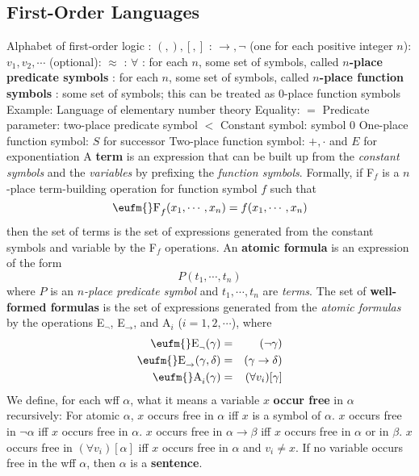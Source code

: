 \documentclass{myproc}
\def\EE{\mbox{\eufm{}E}}
\begin{document}
\subsection{First-Order Languages}
\bit
\w Alphabet of first-order logic
	\bit
		\bit
		: $(, ), [, ]$
		: $\rightarrow, \neg$
		 (one for each positive integer $n$):
			$v_1, v_2, \cdots$
		 (optional): $\approx$
		\eit
		\bit
		: $\forall$
		: for each $n$, some set of symbols,
				called {\bf{}$n$-place predicate symbols}
		: for each $n$, some set of symbols,
				called {\bf{}$n$-place function symbols}
		: some set of symbols; this can be 
			treated as $0$-place function symbols
		\eit
	\eit
\w Example: Language of elementary number theory
	\bit
	\w Equality: $=$
	\w Predicate parameter: two-place predicate symbol $<$
	\w Constant symbol: symbol $0$
	\w One-place function symbol: $S$ for successor
	\w Two-place function symbol: $+, \cdot$ and $E$ for exponentiation
	\eit
\w A {\bf{}term} is an expression that can be built up from the
	{\em{}constant symbols\/} and the {\em{}variables\/} by prefixing the
	{\em{}function symbols\/}. 
		\bit
		\w Formally, if {\eufm{}F}$_f$ is a 
		$n$-place term-building operation for function symbol $f$ such that
		\[ \mbox{\eufm{}F}_f(x_1, \cdots, x_n) = f(x_1, \cdots, x_n) \]
		then the set of terms is the set of expressions generated from the
		constant symbols and variable by the {\eufm{}F}$_f$ operations.
		\eit
\w An {\bf{}atomic formula} is an expression of the form
	\[ P(t_1, \cdots, t_n) \]
	where $P$ is an {\em{}$n$-place predicate symbol\/} and $t_1, \cdots,
	t_n$ are {\em{}terms\/}.
\w The set of {\bf{}well-formed formulas} is the set of expressions
	generated from the {\em{}atomic formulas\/} by the operations
	\EE$_\neg$, \EE$_\rightarrow$, and {\eufm{}A}$_i$ 
	($i = 1, 2, \cdots$), 
	where
		\begin{eqnarray*}
		\EE_\neg (\gamma) & = & (\neg\gamma) \\
		\EE_\rightarrow (\gamma, \delta) & = & (\gamma \rightarrow \delta) \\
		\mbox{\eufm{}A}_i (\gamma) & = & (\forall{v_i})[\gamma]
		\end{eqnarray*}
\w We define, for each wff $\alpha$, what it means a variable $x$ 
	{\bf{}occur free} in $\alpha$ recursively:
	\ben
	\w [(a)] For atomic $\alpha$, $x$ occurs free in $\alpha$ iff
		$x$ is a symbol of $\alpha$.
	\w [(b)] $x$ occurs free in $\neg\alpha$ iff $x$ occurs free in $\alpha$.
	\w [(c)] $x$ occurs free in $\alpha\rightarrow\beta$ 
		iff $x$ occurs free in $\alpha$ or in $\beta$.
	\w [(d)] $x$ occurs free in $(\forall{v_i})[\alpha]$ iff
		$x$ occurs free in $\alpha$ and $v_i \ne x$.
	\een
\w If no variable occurs free in the wff $\alpha$, then $\alpha$ is 
	a {\bf{}sentence}.
\eit
\end{document}
